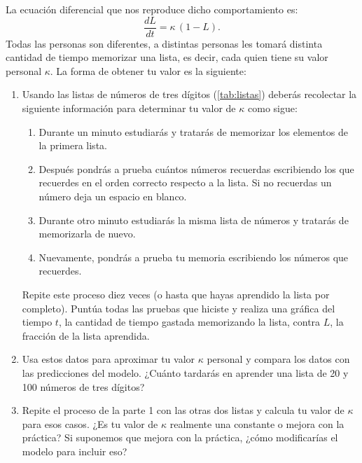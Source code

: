 \begin{ejercicio}[Tipo 1]
La ecuación diferencial que nos reproduce dicho comportamiento es:
\begin{equation}\label{eq:memorizacion}
  \frac{dL}{dt} = \kappa\,(1-L).
\end{equation}
Todas las personas son diferentes, a distintas personas les tomará distinta
cantidad de tiempo memorizar una lista, es decir, cada quien tiene su valor
personal $\kappa$. La forma de obtener tu valor es la siguiente:
\begin{enumerate}
  \item Usando las listas de números de tres dígitos (\cref{tab:listas})
    deberás recolectar la siguiente información para determinar tu valor de
    $\kappa$ como sigue:
    \begin{enumerate}[label=(\alph*)]
      \item Durante un minuto estudiarás y tratarás de memorizar los elementos
        de la primera lista.
      \item Después pondrás a prueba cuántos números recuerdas escribiendo los
        que recuerdes en el orden correcto respecto a la lista. Si no recuerdas
        un número deja un espacio en blanco.
      \item Durante otro minuto estudiarás la misma lista de números y tratarás
        de memorizarla de nuevo.
      \item Nuevamente, pondrás a prueba tu memoria escribiendo los números que
        recuerdes.
    \end{enumerate}
    Repite este proceso diez veces (o hasta que hayas aprendido la lista por
    completo). Puntúa todas las pruebas que hiciste y realiza una gráfica del
    tiempo $t$, la cantidad de tiempo gastada memorizando la lista, contra $L$,
    la fracción de la lista aprendida.
  \item Usa estos datos para aproximar tu valor $\kappa$ personal y compara los
    datos con las predicciones del modelo. ¿Cuánto tardarás en aprender una
    lista de 20 y 100 números de tres dígitos?
  \item Repite el proceso de la parte 1 con las otras dos listas y calcula tu
    valor de $\kappa$ para esos casos. ¿Es tu valor de $\kappa$ realmente una
    constante o mejora con la práctica? Si suponemos que mejora con la práctica,
    ¿cómo modificarías el modelo para incluir eso?
\end{enumerate}


\end{ejercicio}

